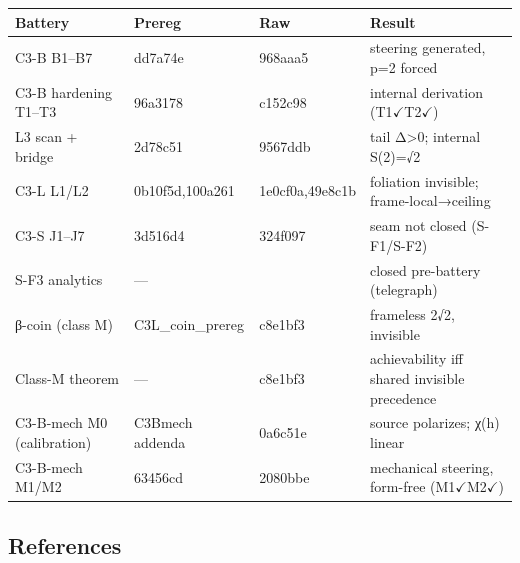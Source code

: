 \documentclass[
  11pt]{article}
\newcounter{none} %
\begin{document}
{\def\LTcaptype{none} %
\begin{longtable}[]{@{}
  >{\raggedright\arraybackslash}p{}
  >{\raggedright\arraybackslash}p{}
  >{\raggedright\arraybackslash}p{}
  >{\raggedright\arraybackslash}p{}@{}}
\toprule\noalign{}
\begin{minipage}[b]{\linewidth}\raggedright
Battery
\end{minipage} & \begin{minipage}[b]{\linewidth}\raggedright
Prereg
\end{minipage} & \begin{minipage}[b]{\linewidth}\raggedright
Raw
\end{minipage} & \begin{minipage}[b]{\linewidth}\raggedright
Result
\end{minipage} \\
\midrule\noalign{}
\endhead
\bottomrule\noalign{}
\endlastfoot
C3-B B1--B7 & dd7a74e & 968aaa5 & steering generated, p=2 forced \\
C3-B hardening T1--T3 & 96a3178 & c152c98 & internal derivation
(T1\(\checkmark\)T2\(\checkmark\)) \\
L3 scan + bridge & 2d78c51 & 9567ddb & tail Δ\textgreater0; internal
S(2)=√2 \\
C3-L L1/L2 & 0b10f5d,100a261 & 1e0cf0a,49e8c1b & foliation invisible;
frame-local→ceiling \\
C3-S J1--J7 & 3d516d4 & 324f097 & seam not closed (S-F1/S-F2) \\
S-F3 analytics & --- & 2053106 & closed pre-battery (telegraph) \\
β-coin (class M) & C3L\_coin\_prereg & c8e1bf3 & frameless 2√2,
invisible \\
Class-M theorem & --- & c8e1bf3 & achievability iff shared invisible
precedence \\
C3-B-mech M0 (calibration) & C3Bmech addenda & 0a6c51e & source
polarizes; χ(h) linear \\
C3-B-mech M1/M2 & 63456cd & 2080bbe & mechanical steering, form-free
(M1\(\checkmark\)M2\(\checkmark\)) \\
\end{longtable}
}

\subsection{References}\label{references}
\end{document}
